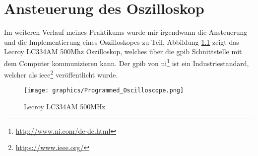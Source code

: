 \chapter{Ansteuerung des Oszilloskop}
\label{ch:osci}

Im weiteren Verlauf meines Praktikums wurde mir irgendwann die Ansteuerung und die Implementierung eines Oszilloskopes zu Teil. 
Abbildung \ref{fig:lc334am} zeigt das Lecroy LC334AM 500Mhz Oszilloskop, welches über die \ac{gpib} Schnittstelle mit dem Computer kommunizieren kann. Der \ac{gpib} von \ac{ni}\footnote{\url{http://www.ni.com/de-de.html}} ist ein Industriestandard, welcher als \ac{ieee}\footnote{\url{https://www.ieee.org/}} veröffentlicht wurde.

\begin{figure}[H]
	\centering
	\texttt{[image: graphics/Programmed\_Oscilloscope.png]}
	\caption{Lecroy LC334AM 500MHz}
	\label{fig:lc334am}
\end{figure}

